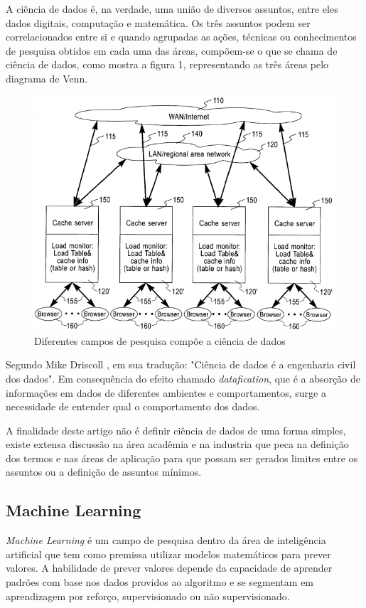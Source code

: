 \documentclass[conference]{IEEEtran}
\begin{document}
A ciência de dados é, na verdade, uma união de diversos assuntos, entre eles dados digitais, computação e matemática. Os três assuntos podem ser correlacionados entre si e quando agrupadas as ações, técnicas ou conhecimentos de pesquisa obtidos em cada uma das áreas, compõem-se o que se chama de ciência de dados, como mostra a figura 1, representando as três áreas pelo diagrama de Venn. \cite{datasciencecathy}

\begin{figure}[h]
\centerline{\includegraphics[width=0.5\linewidth]{figura1.png}}
\caption{Diferentes campos de pesquisa compõe a ciência de dados \cite{tds:barber}}
\label{fig}
\end{figure}

Segundo Mike Driscoll \cite{datasciencecathy}, em sua tradução: "Ciência de dados é a engenharia civil dos dados". Em consequência do efeito chamado \textit{datafication}, que é a absorção de informações em dados de diferentes ambientes e comportamentos, surge a necessidade de entender qual o comportamento dos dados. 

A finalidade deste artigo não é definir ciência de dados de uma forma simples, existe extensa discussão na área acadêmia e na industria que peca na definição dos termos e nas áreas de aplicação para que possam ser gerados limites entre os assuntos ou a definição de assuntos mínimos.

\subsection{Machine Learning}

\textit{Machine Learning} é um campo de pesquisa dentro da área de inteligência artificial que tem como premissa utilizar modelos matemáticos para prever valores. A habilidade de prever valores depende da capacidade de aprender padrões com base nos dados providos ao algoritmo e se segmentam em aprendizagem por reforço, supervisionado ou não supervisionado.
\end{document}

